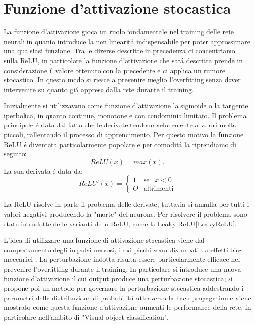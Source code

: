 \documentclass[a4paper,12pt]{report}
\begin{document}
 \section{Funzione d'attivazione stocastica}
 La funzione d'attivazione gioca un ruolo fondamentale nel training delle rete neurali in quanto introduce la non linearit\'a indispensabile per poter approssimare una qualsiasi funzione. 
 Tra le diverse descritte in precedenza ci concentriamo sulla ReLU, in particolare la funzione d'attivazione che sar\'a descritta prende in considerazione il valore ottenuto con la precedente e ci applica un rumore stocastico. 
 In questo modo si riesce a prevenire meglio l'overfitting senza dover intervenire su quanto gi\'a appreso dalla rete durante il training. 
 
 Inizialmente si utilizzavano come funzione d'attivazione la sigmoide o la tangente iperbolica, in quanto continue, monotone e con condominio limitato. 
 Il problema principale \'e dato dal fatto che le derivate tendono velocemente a valori molto piccoli, rallentando il processo di apprendimento. 
 Per questo motivo la funzione ReLU \'e diventata particolarmente popolare e per comodit\'a la riprendiamo di seguito:
 \begin{equation} 
  ReLU\left(x\right) = max\left(x\right). 
 \end{equation} 
 La sua derivata  \'e data da:
 \begin{equation} 
  ReLU'\left(x\right) = \begin{cases} 
     1 & \mbox{se} \;\;\; x < 0 \\
     O & \mbox{altrimenti} 
 \end{cases} 
 \end{equation} 

 La ReLU risolve in parte il problema delle derivate, tuttavia si annulla per tutti i valori negativi producendo la "morte" del neurone. 
 Per risolvere il problema sono state introdotte delle varianti della ReLU, come la Leaky ReLU\ref{LeakyReLU}. 
 
 L'idea di utilizzare una funzione di attivazione stocastica viene dal comportamento degli impulsi nervosi, i cui picchi sono disturbati da effetti bio-meccanici \cite{lewicki1998review}. 
 La perturbazione indotta risulta essere particolarmente efficace nel prevenire l'overfitting durante il training. 
 In particolare si introduce una nuova funzione d'attivazione il cui output produce una perturbazione stocastica; si propone poi un metodo per governare la perturbazione stocastica addestrando i parametri della distribuzione di probabilit\'a attraverso la back-propagation e viene mostrato come questa funzione d'attivazione aumenti le performance della rete, in particolare nell'ambito di "Visual object classification". 
 
\end{document}
